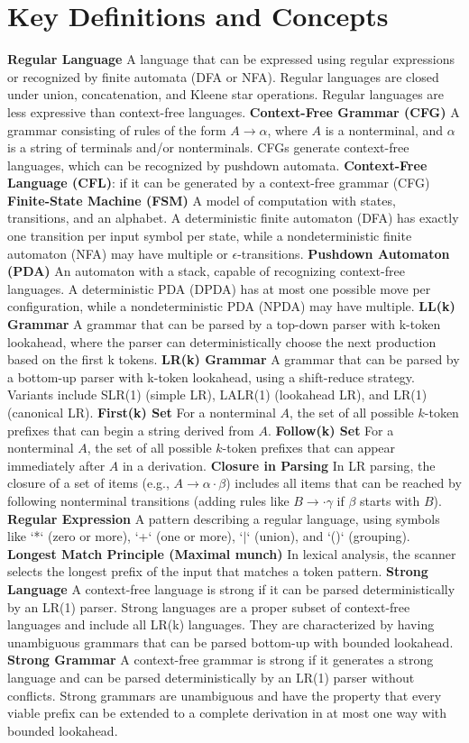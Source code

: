 
\section{Key Definitions and Concepts}
\textbf{Regular Language} A language that can be expressed using regular expressions or recognized by finite automata (DFA or NFA). Regular languages are closed under union, concatenation, and Kleene star operations.  Regular languages are less expressive than context-free languages.
\textbf{Context-Free Grammar (CFG)} A grammar consisting of rules of the form $A \rightarrow \alpha $, where $A$ is a nonterminal, and $\alpha $ is a string of terminals and/or nonterminals. CFGs generate context-free languages, which can be recognized by pushdown automata.
\textbf{Context-Free Language (CFL)}: if it can be generated by a context-free grammar (CFG)
\textbf{Finite-State Machine (FSM)} A model of computation with states, transitions, and an alphabet. A deterministic finite automaton (DFA) has exactly one transition per input symbol per state, while a nondeterministic finite automaton (NFA) may have multiple or $\epsilon$-transitions.
\textbf{Pushdown Automaton (PDA)} An automaton with a stack, capable of recognizing context-free languages. A deterministic PDA (DPDA) has at most one possible move per configuration, while a nondeterministic PDA (NPDA) may have multiple.
\textbf{LL(k) Grammar} A grammar that can be parsed by a top-down parser with k-token lookahead, where the parser can deterministically choose the next production based on the first k tokens.
\textbf{LR(k) Grammar} A grammar that can be parsed by a bottom-up parser with k-token lookahead, using a shift-reduce strategy. Variants include SLR(1) (simple LR), LALR(1) (lookahead LR), and LR(1) (canonical LR).
\textbf{First(k) Set} For a nonterminal $A$, the set of all possible $k$-token prefixes that can begin a string derived from $A$.
\textbf{Follow(k) Set} For a nonterminal $A$, the set of all possible $k$-token prefixes that can appear immediately after $A$ in a derivation.
\textbf{Closure in Parsing} In LR parsing, the closure of a set of items (e.g., $A \rightarrow \alpha \cdot \beta $) includes all items that can be reached by following nonterminal transitions (adding rules like $B \rightarrow \cdot \gamma$ if $\beta $ starts with $B$).
\textbf{Regular Expression} A pattern describing a regular language, using symbols like `*` (zero or more), `+` (one or more), `$\vert$` (union), and `()` (grouping).
\textbf{Longest Match Principle (Maximal munch)} In lexical analysis, the scanner selects the longest prefix of the input that matches a token pattern.
\textbf{Strong Language} A context-free language is strong if it can be parsed deterministically by an LR(1) parser. Strong languages are a proper subset of context-free languages and include all LR(k) languages. They are characterized by having unambiguous grammars that can be parsed bottom-up with bounded lookahead.
\textbf{Strong Grammar} A context-free grammar is strong if it generates a strong language and can be parsed deterministically by an LR(1) parser without conflicts. Strong grammars are unambiguous and have the property that every viable prefix can be extended to a complete derivation in at most one way with bounded lookahead.
